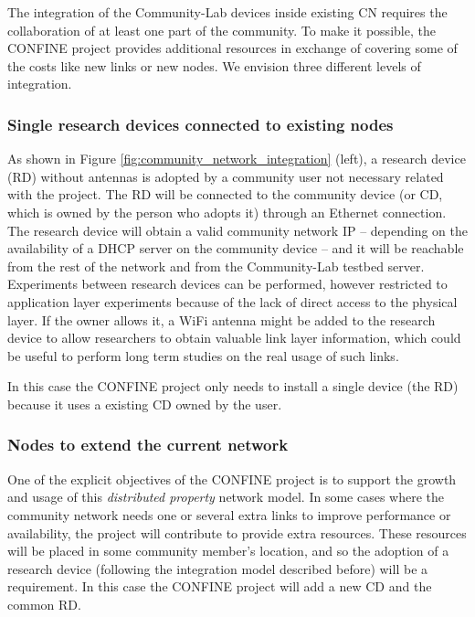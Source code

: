 \documentclass[conference]{IEEEtran}
\begin{document}
The integration of the Community-Lab devices inside existing CN requires the collaboration of at least
one part of the community. To make it possible, the CONFINE project provides additional resources in exchange
of covering some of the costs like new links or new nodes. We envision three different levels of integration.

\subsubsection{Single research devices connected to existing nodes}
\label{sec:single-research-devices}

As shown in Figure \ref{fig:community_network_integration} (left), a research device (RD) without antennas is 
adopted by a community user not necessary related with the project.
The RD will be connected to the community device (or CD, which is owned by the person who adopts it) through an Ethernet connection. 
The research device will obtain a valid community network IP -- depending on the availability of a DHCP server on the community device --
and it will be reachable from the rest of the network and from the Community-Lab testbed server.
Experiments between research devices can be performed, however restricted to application layer experiments because of the 
lack of direct access to the physical layer. If the owner allows it, a WiFi antenna might be 
added to the research device to allow researchers to obtain valuable link layer information, which could
be useful to perform long term studies on the real usage of such links.

In this case the CONFINE project only needs to install a single device (the RD) because it uses a existing
CD owned by the user. 


\subsubsection{Nodes to extend the current network}

One of the explicit objectives of the CONFINE project is to support the growth and usage of this 
\textit{distributed property} network model. In some cases where the community network needs one or 
several extra links to improve performance or availability, the project will
contribute to provide extra resources. These resources will be placed in some community 
member's location, and so the adoption of a research device (following the integration model 
described before) will be a requirement. In this case the CONFINE project will add a new CD and the common RD.
\end{document}
